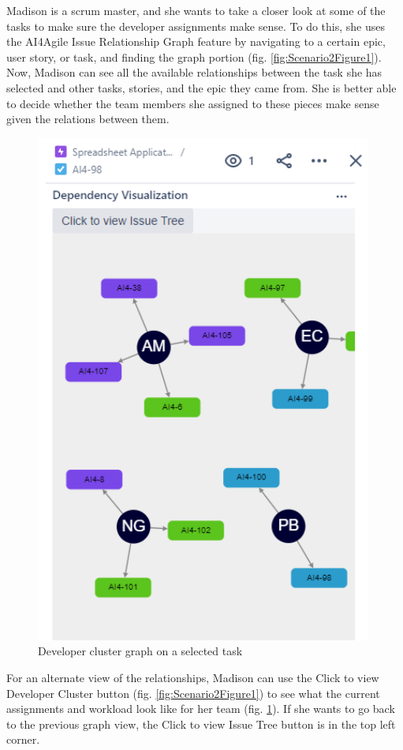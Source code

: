 Madison is a scrum master, and she wants to take a closer look at some of the tasks to make sure the developer assignments make sense. To do this, she uses the AI4Agile Issue Relationship Graph feature by navigating to a certain epic, user story, or task, and finding the graph portion (fig. \ref{fig:Scenario2Figure1}). Now, Madison can see all the available relationships between the task she has selected and other tasks, stories, and the epic they came from. She is better able to decide whether the team members she assigned to these pieces make sense given the relations between them.

\begin{figure}
\centerline{\includegraphics[width=\textwidth,height=\textheight,keepaspectratio]{./figure/Scenario2Figure2.png}}
\caption{Developer cluster graph on a selected task}
\label{fig:Scenario2Figure2}
\end{figure}

For an alternate view of the relationships, Madison can use the Click to view Developer Cluster button (fig. \ref{fig:Scenario2Figure1}) to see what the current assignments and workload look like for her team (fig. \ref{fig:Scenario2Figure2}). If she wants to go back to the previous graph view, the Click to view Issue Tree button is in the top left corner.